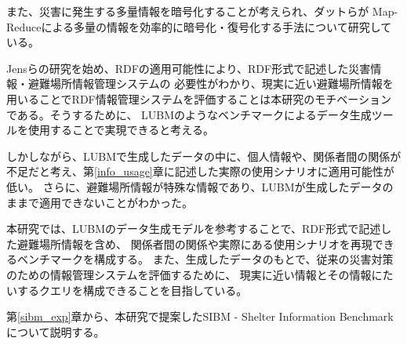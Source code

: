 また、災害に発生する多量情報を暗号化することが考えられ、ダットら\cite{cite:dat}が
Map-Reduceによる多量の情報を効率的に暗号化・復号化する手法について研究している。

Jensらの研究\cite{cite:opendata}を始め、RDFの適用可能性により、RDF形式で記述した災害情報・避難場所情報管理システムの
必要性がわかり、現実に近い避難場所情報を用いることでRDF情報管理システムを評価することは本研究のモチベーションである。そうするために、
LUBMのようなベンチマークによるデータ生成ツールを使用することで実現できると考える。

しかしながら、LUBMで生成したデータの中に、個人情報や、関係者間の関係が不足だと考え、第\ref{info_usage}章に記述した実際の使用シナリオに適用可能性が低い。
さらに、避難場所情報が特殊な情報であり、LUBMが生成したデータのままで適用できないことがわかった。

本研究では、LUBMのデータ生成モデルを参考することで、RDF形式で記述した避難場所情報を含め、
関係者間の関係や実際にある使用シナリオを再現できるベンチマークを構成する。
また、生成したデータのもとで、従来の災害対策のための情報管理システムを評価するために、
現実に近い情報とその情報にたいするクエリを構成できることを目指している。

第\ref{sibm_exp}章から、本研究で提案したSIBM - Shelter Information Benchmarkについて説明する。
